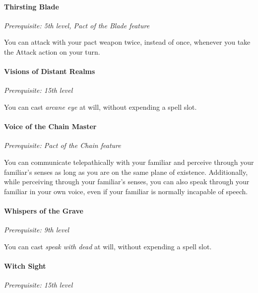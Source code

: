 \documentclass[
]{article}
\begin{document}
\hypertarget{thirsting-blade}{%
\paragraph{Thirsting Blade}\label{thirsting-blade}}

\emph{Prerequisite: 5th level, Pact of the Blade feature}

You can attack with your pact weapon twice, instead of once, whenever
you take the Attack action on your turn.

\hypertarget{visions-of-distant-realms}{%
\paragraph{Visions of Distant Realms}\label{visions-of-distant-realms}}

\emph{Prerequisite: 15th level}

You can cast \emph{arcane eye} at will, without expending a spell slot.

\hypertarget{voice-of-the-chain-master}{%
\paragraph{Voice of the Chain Master}\label{voice-of-the-chain-master}}

\emph{Prerequisite: Pact of the Chain feature}

You can communicate telepathically with your familiar and perceive
through your familiar's senses as long as you are on the same plane of
existence. Additionally, while perceiving through your familiar's
senses, you can also speak through your familiar in your own voice, even
if your familiar is normally incapable of speech.

\hypertarget{whispers-of-the-grave}{%
\paragraph{Whispers of the Grave}\label{whispers-of-the-grave}}

\emph{Prerequisite: 9th level}

You can cast \emph{speak with dead} at will, without expending a spell
slot.

\hypertarget{witch-sight}{%
\paragraph{Witch Sight}\label{witch-sight}}

\emph{Prerequisite: 15th level}
\end{document}
